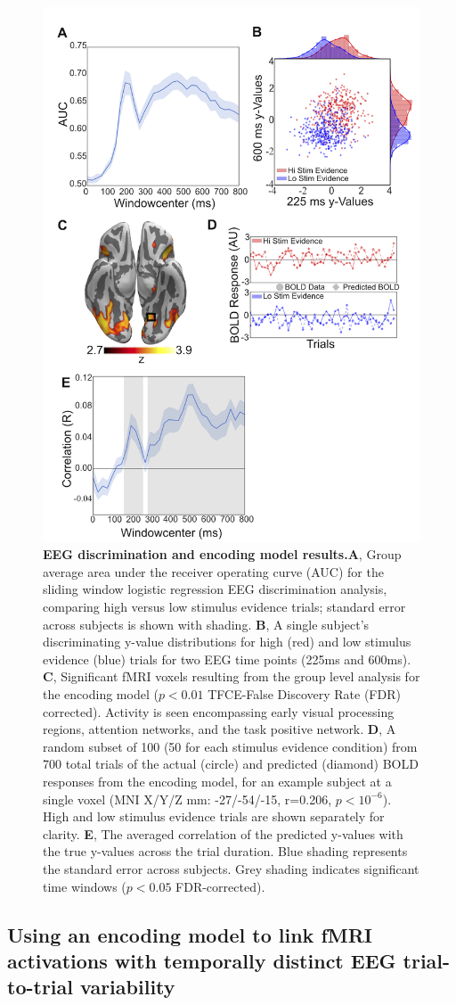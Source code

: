 \begin{figure}[h!]
\centering
\includegraphics[width=.4\textwidth]{Fig4.png}

\caption{\textbf{EEG discrimination and encoding model results.}\textbf{A}, Group average area under the receiver operating curve (AUC) for the sliding window logistic regression EEG discrimination analysis, comparing high versus low stimulus evidence trials; standard error across subjects is shown with shading. \textbf{B}, A single subject's discriminating y-value distributions for high (red) and low stimulus evidence (blue) trials for two EEG time points (225ms and 600ms). \textbf{C}, Significant fMRI voxels resulting from the group level analysis for the encoding model ($p< 0.01$ TFCE-False Discovery Rate (FDR) corrected). Activity is seen encompassing early visual processing regions, attention networks, and the task positive network. \textbf{D}, A random subset of 100 (50 for each stimulus evidence condition) from 700 total trials of the actual (circle) and predicted (diamond) BOLD responses from the encoding model, for an example subject at a single voxel (MNI X/Y/Z mm: -27/-54/-15, r=0.206, $p<10^{-6}$). High and low stimulus evidence trials are shown separately for clarity. \textbf{E}, The averaged correlation of the predicted y-values with the true y-values across the trial duration. Blue shading represents the standard error across subjects. Grey shading indicates significant time windows ($p< 0.05$ FDR-corrected).}
\label{fig:EEGResults}
\end{figure}

\subsection*{Using an encoding model to link fMRI activations with temporally distinct EEG trial-to-trial variability}

